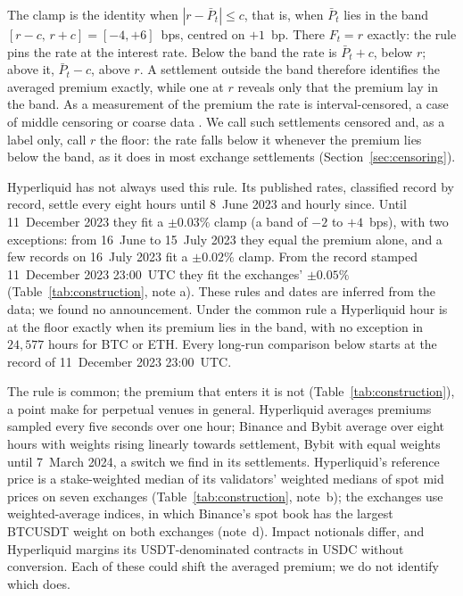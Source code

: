 \documentclass[10pt,a4paper]{article}
\begin{document}
The clamp is the identity when $|r - \bar P_t| \le c$, that is, when $\bar P_t$ lies in the band $[r-c,\, r+c] = [-4, +6]$~bps, centred on $+1$~bp. There $F_t = r$ exactly: the rule pins the rate at the interest rate. Below the band the rate is $\bar P_t + c$, below $r$; above it, $\bar P_t - c$, above $r$. A settlement outside the band therefore identifies the averaged premium exactly, while one at $r$ reveals only that the premium lay in the band. As a measurement of the premium the rate is interval-censored, a case of middle censoring \citep{jammalamadaka2003} or coarse data \citep{heitjan1991}. We call such settlements censored and, as a label only, call $r$ the floor: the rate falls below it whenever the premium lies below the band, as it does in most exchange settlements (Section~\ref{sec:censoring}).

Hyperliquid has not always used this rule. Its published rates, classified record by record, settle every eight hours until 8~June 2023 and hourly since. Until 11~December 2023 they fit a $\pm 0.03\%$ clamp (a band of $-2$ to $+4$~bps), with two exceptions: from 16~June to 15~July 2023 they equal the premium alone, and a few records on 16~July 2023 fit a $\pm 0.02\%$ clamp. From the record stamped 11~December 2023 23:00~UTC they fit the exchanges' $\pm 0.05\%$ (Table~\ref{tab:construction}, note a). These rules and dates are inferred from the data; we found no announcement. Under the common rule a Hyperliquid hour is at the floor exactly when its premium lies in the band, with no exception in $24{,}577$ hours for BTC or ETH. Every long-run comparison below starts at the record of 11~December 2023 23:00~UTC.

The rule is common; the premium that enters it is not (Table~\ref{tab:construction}), a point \citet{erez2026venues} make for perpetual venues in general. Hyperliquid averages premiums sampled every five seconds over one hour; Binance and Bybit average over eight hours with weights rising linearly towards settlement, Bybit with equal weights until 7~March 2024, a switch we find in its settlements. Hyperliquid's reference price is a stake-weighted median of its validators' weighted medians of spot mid prices on seven exchanges (Table~\ref{tab:construction}, note~b); the exchanges use weighted-average indices, in which Binance's spot book has the largest BTCUSDT weight on both exchanges (note~d). Impact notionals differ, and Hyperliquid margins its USDT-denominated contracts in USDC without conversion. Each of these could shift the averaged premium; we do not identify which does.
\end{document}
